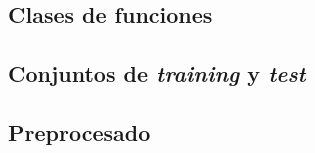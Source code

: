 \documentclass[a4paper, 20pt]{article}
\begin{document}
\subsection{Clases de funciones}

\subsection{Conjuntos de \textit{training} y \textit{test}}
\subsection{Preprocesado}

\end{document}

